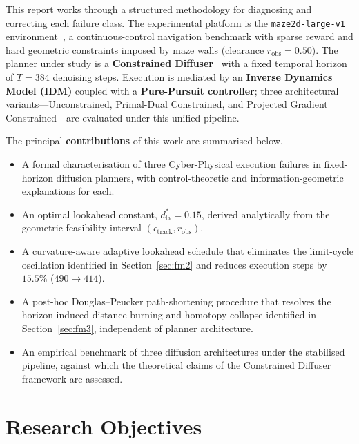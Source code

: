 \documentclass[12pt, a4paper, oneside]{report}
\theoremstyle{definition}
\newcommand{\dlookahead}{d_{\mathrm{la}}}
\begin{document}
This report works through a structured methodology for diagnosing
and correcting each failure class. The experimental platform is the
\texttt{maze2d-large-v1} environment~\citep{fu2020d4rl}, a
continuous-control navigation benchmark with sparse reward and hard
geometric constraints imposed by maze walls (clearance
$r_{\mathrm{obs}} = 0.50$). The planner under study is a
\textbf{Constrained Diffuser}~\citep{zhang2026constrained} with a fixed temporal horizon of
$T = 384$ denoising steps. Execution is mediated by an
\textbf{Inverse Dynamics Model (IDM)} coupled with a
\textbf{Pure-Pursuit controller}; three architectural
variants---Unconstrained, Primal-Dual Constrained, and Projected
Gradient Constrained---are evaluated under this unified pipeline.

The principal \textbf{contributions} of this work are summarised
below.
\begin{itemize}[itemsep=4pt]
  \item A formal characterisation of three Cyber-Physical execution
        failures in fixed-horizon diffusion planners, with
        control-theoretic and information-geometric explanations
        for each.
  \item An optimal lookahead constant, $\dlookahead^* = 0.15$,
        derived analytically from the geometric feasibility
        interval $(\epsilon_{\mathrm{track}}, r_{\mathrm{obs}})$.
  \item A curvature-aware adaptive lookahead schedule that
        eliminates the limit-cycle oscillation identified in
        Section~\ref{sec:fm2} and reduces execution steps by
        $15.5\%$ ($490 \to 414$).
  \item A post-hoc Douglas--Peucker path-shortening procedure that
        resolves the horizon-induced distance burning and homotopy
        collapse identified in Section~\ref{sec:fm3}, independent
        of planner architecture.
  \item An empirical benchmark of three diffusion architectures
        under the stabilised pipeline, against which the
        theoretical claims of the Constrained Diffuser framework
        are assessed.
\end{itemize}

\section{Research Objectives}
\label{sec:objectives}
\end{document}
